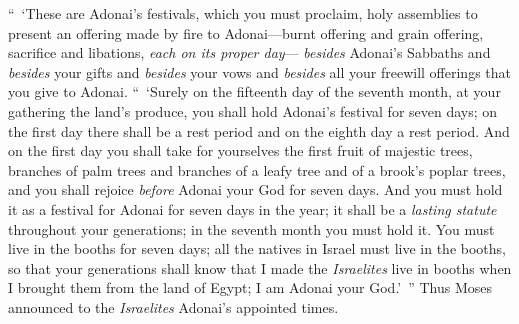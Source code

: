 \begin{biblechapter}
 “ ‘These are Adonai’s festivals, which you must proclaim, holy assemblies to present an offering made by fire to Adonai—burnt offering and grain offering, sacrifice and libations, \textit{each on its proper day}—
\verse \textit{besides} Adonai’s Sabbaths and \textit{besides} your gifts and \textit{besides} your vows and \textit{besides} all your freewill offerings that you give to Adonai.
\verse “ ‘Surely on the fifteenth day of the seventh month, at your gathering the land’s produce, you shall hold Adonai’s festival for seven days; on the first day there shall be a rest period and on the eighth day a rest period.
\verse And on the first day you shall take for yourselves the first fruit of majestic trees, branches of palm trees and branches of a leafy tree and of a brook’s poplar trees, and you shall rejoice \textit{before} Adonai your God for seven days.
\verse And you must hold it as a festival for Adonai for seven days in the year; it shall be a \textit{lasting statute} throughout your generations; in the seventh month you must hold it.
\verse You must live in the booths for seven days; all the natives in Israel must live in the booths,
\verse so that your generations shall know that I made the \textit{Israelites} live in booths when I brought them from the land of Egypt; I am Adonai your God.’ ”
\verse Thus Moses announced to the \textit{Israelites} Adonai’s appointed times.
\end{biblechapter}

